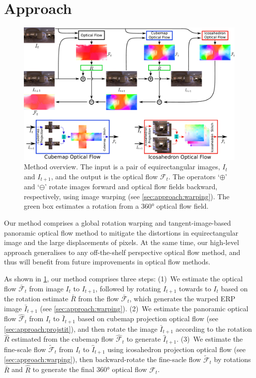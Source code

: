 \section{Approach}
\label{sec:approach}

\begin{figure}%
	\centering
	\includegraphics[width=0.95\linewidth]{images/method_pipeline_1.pdf}
	\caption{Method overview.
		The input is a pair of equirectangular images, $I_t$ and $I_{t+1}$, and the output is the optical flow $\mathcal{F}_t$.
		The operators `$\oplus$' and `$\ominus$' rotate images forward and optical flow fields backward, respectively, using image warping (see \cref{sec:approach:warping}).
		The green box estimates a rotation from a 360° optical flow field.
	}
	\label{fig:approach:pipeline}
\end{figure}

Our method comprises a global rotation warping and tangent-image-based panoramic optical flow method to mitigate the distortions in equirectangular image and the large displacements of pixels.
At the same time, our high-level approach generalises to any off-the-shelf perspective optical flow method, and thus will benefit from future improvements in optical flow methods.


As shown in \cref{fig:approach:pipeline}, our method comprises three steps:
%
(1)~We estimate the optical flow $\bar{\mathcal{F}}_t$ from  image $I_{t}$ to ${I_{t+1}}$, followed by rotating $I_{t+1}$ towards to $I_{t}$ based on the rotation estimate $\bar{R}$ from the flow $\bar{\mathcal{F}}_t$, which generates the warped ERP image ${\bar{I}}_{t+1}$ (see \cref{sec:approach:warping}).
%
(2)~We estimate the panoramic optical flow ${\hat{\mathcal{F}}}_t$ from $I_{t}$ to ${\bar{I}}_{t+1}$ based on cubemap projection optical flow (see \cref{sec:approach:projstit}), and then rotate the image ${\bar{I}}_{t+1}$ according to the rotation $\hat{R}$ estimated from the cubemap flow ${\hat{\mathcal{F}}}_t$ to generate ${\hat{I}}_{t+1}$.
%
(3)~We estimate the fine-scale flow $\tilde{\mathcal{F}}_t$ from $I_{t}$ to ${\hat{I}}_{t+1}$ using icosahedron projection optical flow (see \cref{sec:approach:warping}), then backward-rotate the fine-sacle flow $\tilde{\mathcal{F}}_t$ by rotations $\bar{R}$ and $\hat{R}$ to generate the final 360° optical flow $\mathcal{F}_t$.



